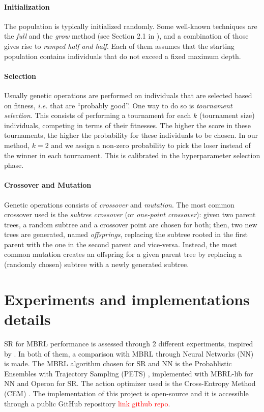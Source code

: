 \documentclass[11pt]{article}
\begin{document}
\paragraph{Initialization} The population is typically initialized randomly. Some well-known techniques are the \textsl{full} and the \textsl{grow} method (see Section 2.1 in \cite{o2009riccardo}), and a combination of those gives rise to \textsl{ramped half and half}. Each of them assumes that the starting population contains individuals that do not exceed a fixed maximum depth.

\paragraph{Selection} Usually genetic operations are performed on individuals that are selected based on fitness, \textsl{i.e.} that are ``probably good''. One way to do so is \textsl{tournament selection}. This consists of performing a tournament for each $k$ (tournament size) individuals, competing in terms of their fitnesses. The higher the score in these tournaments, the higher the probability for these individuals to be chosen. In our method, $k=2$ and we assign a non-zero probability to pick the loser instead of the winner in each tournament. This is calibrated in the hyperparameter selection phase. 

\paragraph{Crossover and Mutation} Genetic operations consists of \textsl{crossover} and \textsl{mutation}. The most common crossover used is the \textsl{subtree crossover} (or \textsl{one-point crossover}): given two parent trees, a random subtree and a crossover point are chosen for both; then, two new trees are generated, named \textsl{offsprings}, replacing the subtree rooted in the first parent with the one in the second parent and vice-versa.
Instead, the most common mutation creates an offspring for a given parent tree by replacing a (randomly chosen) subtree with a newly generated subtree. 

\section{Experiments and implementations details}
SR for MBRL performance is assessed through 2 different experiments, inspired by \cite{kamienny2022symbolic}. In both of them, a comparison with MBRL through Neural Networks (NN) is made. The MBRL algorithm chosen for SR and NN is the Probablistic Ensembles with Trajectory Sampling (PETS) \cite{chua2018deep}, implemented with MBRL-lib \cite{pineda2021mbrl} for NN and Operon \cite{burlacu2020operon} for SR. The action optimizer used is the Cross-Entropy Method (CEM) \cite{de2005tutorial}.
The implementation of this project is open-source and it is accessible through a public GitHub repository \cite{???} \textcolor{red}{link github repo}.
\end{document}
